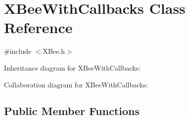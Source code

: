 \hypertarget{class_x_bee_with_callbacks}{}\section{X\+Bee\+With\+Callbacks Class Reference}
\label{class_x_bee_with_callbacks}


{\ttfamily \#include $<$X\+Bee.\+h$>$}



Inheritance diagram for X\+Bee\+With\+Callbacks\+:


Collaboration diagram for X\+Bee\+With\+Callbacks\+:
\subsection*{Public Member Functions}

